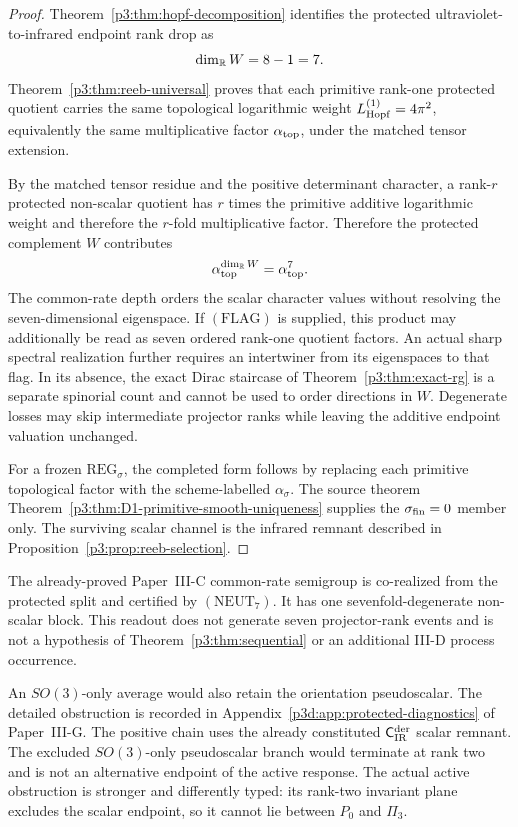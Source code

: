 \documentclass[12pt,a4paper]{article}
\begin{document}
\begin{proof}
Theorem~\ref{p3:thm:hopf-decomposition} identifies the protected
ultraviolet-to-infrared endpoint rank drop as
\[
        \dim_{\mathbb{R}}W=8-1=7.
\]
Theorem~\ref{p3:thm:reeb-universal} proves that each primitive rank-one
protected quotient carries the same topological logarithmic weight
\(L_{\mathrm{Hopf}}^{(1)}=4\pi^2\), equivalently the same multiplicative factor
\(\alpha_{\rm top}\), under the matched tensor extension.

By the matched tensor residue and the positive determinant character, a
rank-\(r\) protected non-scalar quotient has \(r\) times the primitive
additive logarithmic weight and therefore the \(r\)-fold multiplicative
factor.  Therefore the protected complement \(W\)
contributes
\[
        \alpha_{\rm top}^{\dim_{\mathbb{R}}W}
        =
        \alpha_{\rm top}^{7}.
\]
The common-rate depth orders the scalar character values without resolving
the seven-dimensional eigenspace.  If \((\mathrm{FLAG})\) is supplied, this
product may additionally be read as seven ordered rank-one quotient factors.
An actual sharp spectral realization further
requires an intertwiner from its eigenspaces to that flag.  In its absence,
the exact Dirac staircase of Theorem~\ref{p3:thm:exact-rg} is a separate
spinorial count and cannot be used to order directions in \(W\).  Degenerate
losses may skip intermediate projector ranks while leaving the additive
endpoint valuation unchanged.

For a frozen \(\mathrm{REG}_\sigma\), the completed form follows by replacing
each primitive topological factor with the scheme-labelled
\(\alpha_\sigma\).  The source theorem
Theorem~\ref{p3:thm:D1-primitive-smooth-uniqueness} supplies the
\(\sigma_{\rm fin}=0\) member only.  The surviving scalar channel is the
infrared remnant described in Proposition~\ref{p3:prop:reeb-selection}.
\end{proof}

\begin{remark}
The already-proved Paper~III-C common-rate semigroup is co-realized from the
protected split and certified by \((\mathrm{NEUT}_7)\).  It has one sevenfold-degenerate
non-scalar block.  This readout does not generate seven projector-rank events
and is not a hypothesis of Theorem~\ref{p3:thm:sequential} or an additional
III-D process occurrence.
\end{remark}

\begin{remark}
\label{p3:rem:pseudoscalar-diagnostic-pointer}
An \(SO(3)\)-only average would also retain the orientation pseudoscalar.  The detailed obstruction is
recorded in Appendix~\ref{p3d:app:protected-diagnostics} of Paper~III-G.  The positive chain
uses the already constituted
\(\mathsf C_{\rm IR}^{\rm der}\) scalar remnant.  The excluded
\(SO(3)\)-only pseudoscalar branch would terminate at rank two and is not an
alternative endpoint of the active response.  The actual active obstruction
is stronger and differently typed: its rank-two invariant plane excludes the
scalar endpoint, so it cannot lie between \(P_0\) and \(\Pi_3\).
\end{remark}
\end{document}
